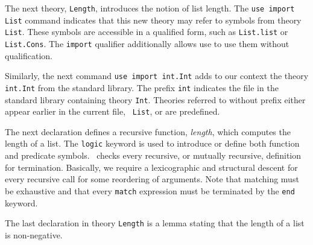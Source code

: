 The next theory, \texttt{Length}, introduces the notion of list
length. The \texttt{use import List} command indicates that this new
theory may refer to symbols from theory \texttt{List}. These symbols
are accessible in a qualified form, such as \texttt{List.list} or
\texttt{List.Cons}. The \texttt{import} qualifier additionally allows
use to use them without qualification.

Similarly, the next command \texttt{use import int.Int} adds to our
context the theory \texttt{int.Int} from the standard library. The
prefix \texttt{int} indicates the file in the standard library
containing theory \texttt{Int}. Theories referred to without prefix
either appear earlier in the current file, \eg\ \texttt{List}, or are
predefined. 

The next declaration defines a recursive function, \emph{length},
which computes the length of a list. The \texttt{logic} keyword is
used to introduce or define both function and predicate symbols. 
\why\ checks every recursive, or mutually recursive, definition for
termination. Basically, we require a lexicographic and structural
descent for every recursive call for some reordering of arguments. 
Note that matching must be exhaustive and that every \texttt{match}
expression must be terminated by the \texttt{end} keyword.

The last declaration in theory \texttt{Length} is a lemma stating that
the length of a list is non-negative. 





